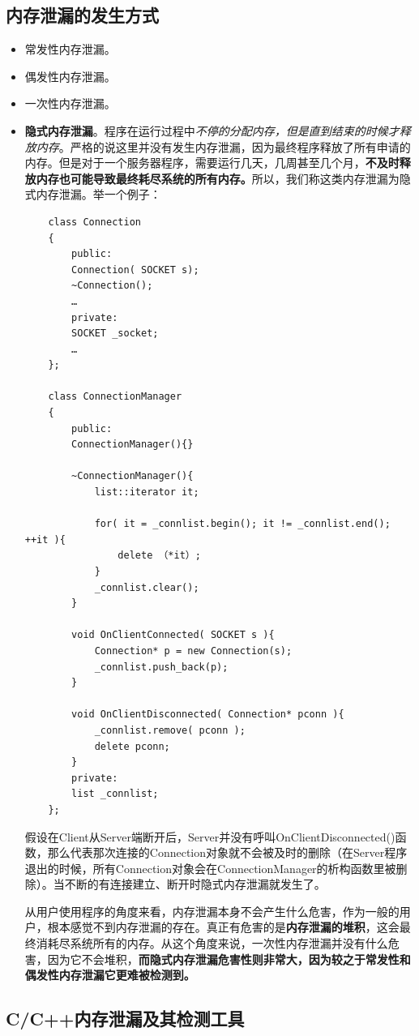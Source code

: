 \documentclass[UTF8,a4paper,12pt]{ctexbook}
\begin{document}
		\subsection{内存泄漏的发生方式}
			\begin{itemize}
				\item 常发性内存泄漏。
				\item 偶发性内存泄漏。
				\item 一次性内存泄漏。
				\item \textbf{隐式内存泄漏}。程序在运行过程中\textit{不停的分配内存，但是直到结束的时候才释放内存}。严格的说这里并没有发生内存泄漏，因为最终程序释放了所有申请的内存。但是对于一个服务器程序，需要运行几天，几周甚至几个月，\textbf{不及时释放内存也可能导致最终耗尽系统的所有内存。}所以，我们称这类内存泄漏为隐式内存泄漏。举一个例子：
				\begin{lstlisting}
	class Connection
	{
		public:
		Connection( SOCKET s);
		~Connection();	
		…	
		private:
		SOCKET _socket;
		…	
	};
	
	class ConnectionManager	
	{
		public:
		ConnectionManager(){}
		
		~ConnectionManager(){
			list::iterator it;
			
			for( it = _connlist.begin(); it != _connlist.end(); ++it ){
				delete （*it）;
			}
			_connlist.clear();
		}
		
		void OnClientConnected( SOCKET s ){
			Connection* p = new Connection(s);
			_connlist.push_back(p);
		}
		
		void OnClientDisconnected( Connection* pconn ){
			_connlist.remove( pconn );
			delete pconn;	
		}
		private:
		list _connlist;	
	};
				\end{lstlisting}
				假设在Client从Server端断开后，Server并没有呼叫OnClientDisconnected()函数，那么代表那次连接的Connection对象就不会被及时的删除（在Server程序退出的时候，所有Connection对象会在ConnectionManager的析构函数里被删除）。当不断的有连接建立、断开时隐式内存泄漏就发生了。
				
				从用户使用程序的角度来看，内存泄漏本身不会产生什么危害，作为一般的用户，根本感觉不到内存泄漏的存在。真正有危害的是\textbf{内存泄漏的堆积}，这会最终消耗尽系统所有的内存。从这个角度来说，一次性内存泄漏并没有什么危害，因为它不会堆积，\textbf{而隐式内存泄漏危害性则非常大，因为较之于常发性和偶发性内存泄漏它更难被检测到。}
				
			\end{itemize}
		\subsection{C/C++内存泄漏及其检测工具}
			
\end{document}
